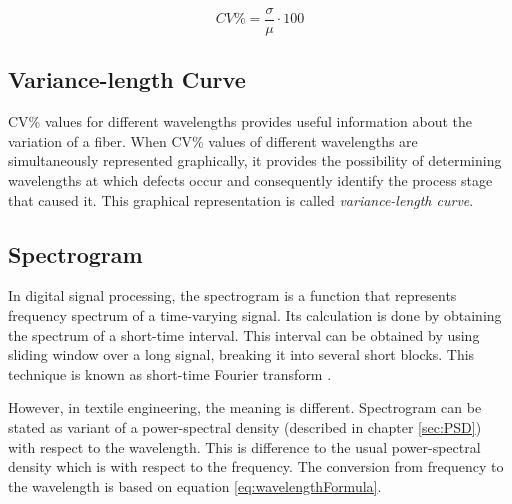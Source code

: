 \documentclass[twoside]{ctuthesis}
\theoremstyle{plain}
\theoremstyle{definition}
\theoremstyle{note}
\begin{document}
\begin{equation} \label{eq:CVCalculationIntroduction}
 CV\% = \frac{\sigma}{\mu} \cdot 100
\end{equation}

\subsection{Variance-length Curve}
\label{sec:VarianceL_curve}
CV\% values for different wavelengths provides useful information about the variation of a fiber. When CV\% values of different wavelengths are simultaneously represented graphically, it provides the possibility of determining wavelengths at which defects occur and consequently identify the process stage that caused it. This graphical representation is called \textit{variance-length curve}.

\subsection{Spectrogram}
\label{SpecExplained}
In digital signal processing, the spectrogram is a function that represents frequency spectrum of a time-varying signal. Its calculation is done by obtaining the spectrum of a short-time interval. This interval can be obtained by using sliding window over a long signal, breaking it into several short blocks. This technique is known as short-time Fourier transform \cite{cite:RT_DSP}. 

However, in textile engineering, the meaning is different. Spectrogram can be stated as variant of a power-spectral density (described in chapter \ref{sec:PSD}) with respect to the wavelength. This is difference to the usual power-spectral density which is with respect to the frequency. The conversion from frequency to the wavelength is based on equation \ref{eq:wavelengthFormula}.
\end{document}
